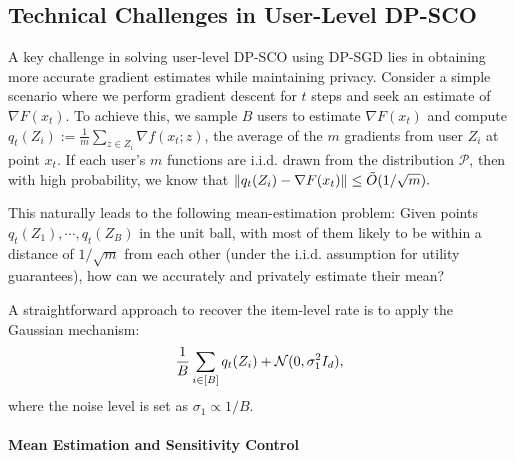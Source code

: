 \subsection{Technical Challenges in User-Level DP-SCO}

A key challenge in solving user-level DP-SCO using DP-SGD lies in obtaining more accurate gradient estimates while maintaining privacy. 
Consider a simple scenario where we perform gradient descent for $t$ steps and seek an estimate of $\nabla F(x_t)$. 
To achieve this, we sample $B$ users to estimate $\nabla F(x_t)$ and compute $q_t(Z_i):=\frac{1}{m}\sum_{z\in Z_i}\nabla f(x_t;z)$, the average of the $m$ gradients from user $Z_i$ at point $x_t$. 
If each user's $m$ functions are i.i.d. drawn from the distribution $\mathcal{P}$, then with high probability, we know that 
$
\|q_t(Z_i) - \nabla F(x_t)\| \leq \Tilde{O}(1/\sqrt{m}).
$

This naturally leads to the following mean-estimation problem: Given points $q_t(Z_1), \cdots, q_t(Z_B)$ in the unit ball, with most of them likely to be within a distance of $1/\sqrt{m}$ from each other (under the i.i.d. assumption for utility guarantees), how can we accurately and privately estimate their mean? 

A straightforward approach to recover the item-level rate is to apply the Gaussian mechanism:
\begin{align}
\label{eq:gaussian_mechanism}
\frac{1}{B} \sum_{i \in [B]} q_t(Z_i) + \mathcal{N}(0, \sigma_1^2 I_d),
\end{align}
where the noise level is set as $\sigma_1 \propto 1/B$.

\paragraph{Mean Estimation and Sensitivity Control}

